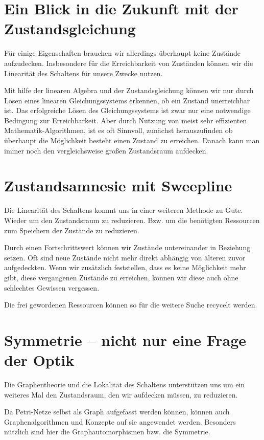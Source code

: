 \section{Ein Blick in die Zukunft mit der Zustandsgleichung}
Für einige Eigenschaften brauchen wir allerdings überhaupt keine Zustände aufzudecken.
Insbesondere für die Erreichbarkeit von Zuständen können wir die Linearität des Schaltens \cite{2.1} für unsere Zwecke nutzen.

Mit hilfe der linearen Algebra und der Zustandsgleichung können wir nur durch Lösen eines linearen Gleichungssystems erkennen, ob ein Zustand unerreichbar ist.
Das erfolgreiche Lösen des Gleichungssystems ist zwar nur eine notwendige Bedingung zur Erreichbarkeit.
Aber durch Nutzung von meist sehr effizienten Mathematik-Algorithmen, ist es oft Sinnvoll, zunächst herauszufinden ob überhaupt die Möglichkeit besteht einen Zustand zu erreichen. Danach kann man immer noch den vergleichsweise großen Zustandsraum aufdecken.

\section{Zustandsamnesie mit Sweepline}
Die Linearität des Schaltens kommt uns in einer weiteren Methode zu Gute.
Wieder um den Zustandsraum zu reduzieren. Bzw. um die benötigten Ressourcen zum Speichern der Zustände zu reduzieren.

Durch einen Fortschrittswert können wir Zustände untereinander in Beziehung setzen.
Oft sind neue Zustände nicht mehr direkt abhängig von älteren zuvor aufgedeckten.
Wenn wir zusätzlich feststellen, dass es keine Möglichkeit mehr gibt, diese vergangenen Zustände zu erreichen, können wir diese auch ohne schlechtes Gewissen vergessen.

Die frei gewordenen Ressourcen können so für die weitere Suche recycelt werden.

\section{Symmetrie -- nicht nur eine Frage der Optik}
Die Graphentheorie und die Lokalität des Schaltens\cite{2.3} unterstützen uns um ein weiteres Mal den Zustandsraum, den wir aufdecken müssen, zu reduzieren.

Da Petri-Netze selbst als Graph aufgefasst werden können, können auch Graphenalgorithmen  und Konzepte auf sie angewendet werden. 
Besonders nützlich sind hier die Graphautomorphismen bzw. die Symmetrie.

